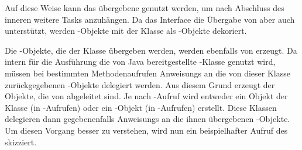 Auf diese Weise kann das übergebene \classCompletableFuture{} genutzt werden, um nach Abschluss des inneren \classCallable{} weitere Tasks anzuhängen.
Da das Interface \classExecutorService{} die Übergabe von \classRunnable{} aber auch \classCallable{} unterstützt, werden \classRunnable{}-Objekte mit der Klasse \classRunnableCallable{} als \classCallable{}-Objekte dekoriert.  

Die \classCompletableFuture{}-Objekte, die der Klasse \classCompletingCallable{} übergeben werden, werden ebenfalls von \classCompletableFutureWrapper{} erzeugt. Da intern für die Ausführung die von Java bereitgestellte \classScheduledThreadPoolExecutor{}-Klasse genutzt wird, müssen bei bestimmten Methodenaufrufen \glspl{Anweisung} an die von dieser Klasse zurückgegebenen \classFuture{}-Objekte delegiert werden. Aus diesem Grund erzeugt der 
\classCompletableFutureWrapper{} Objekte, die von \classCompletableFuture{} abgeleitet sind. Je nach \classExecutor{}-Aufruf wird entweder ein Objekt der Klasse \classDelegatingCompletableFuture{} (in -Aufrufen) oder ein \classDelegatingScheduledCompletableFuture{}-Objekt (in -Aufrufen) erstellt. Diese Klassen delegieren dann gegebenenfalls \glspl{Anweisung} an die ihnen übergebenen \classFuture{}-Objekte. Um diesen Vorgang besser zu verstehen, wird nun ein beispielhafter Aufruf des \classBlocklibExecutor{} skizziert.

